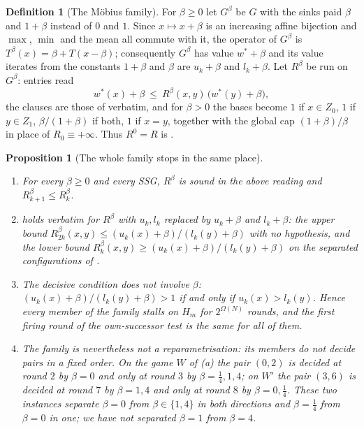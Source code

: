 \documentclass[11pt]{article}
\theoremstyle{plain}
\newtheorem{proposition}[theorem]{Proposition}
\theoremstyle{definition}
\newtheorem{definition}[theorem]{Definition}
\begin{document}
\begin{definition}[The M\"obius family]\label{def:mobius}
For $\beta\ge0$ let $G^{\beta}$ be $G$ with the sinks paid $\beta$ and
$1+\beta$ instead of $0$ and $1$. Since $x\mapsto x+\beta$ is an
increasing affine bijection and $\max$, $\min$ and the mean all commute
with it, the operator of $G^\beta$ is
$T^{\beta}(x)=\beta+T(x-\beta)$; consequently $G^\beta$ has value
$w^\ast+\beta$ and its value iterates from the constants $1+\beta$ and
$\beta$ are $u_k+\beta$ and $l_k+\beta$. Let $R^{\beta}$ be
 run on $G^{\beta}$: entries read
\[
  w^\ast(x)+\beta\ \le\ R^{\beta}(x,y)\,\bigl(w^\ast(y)+\beta\bigr),
\]
the clauses are those of  verbatim, and for $\beta>0$ the
bases become $1$ if $x\in Z_0$, $1$ if $y\in Z_1$, $\beta/(1+\beta)$ if
both, $1$ if $x=y$, together with the global cap $(1+\beta)/\beta$ in
place of $R_0\equiv+\infty$. Thus $R^{0}=R$ is .
\end{definition}

\begin{proposition}[The whole family stops in the same
place]\label{prop:mobius}
\begin{enumerate}[label=(\alph*),leftmargin=2.2em]
\item For every $\beta\ge0$ and every SSG, $R^{\beta}$ is sound in the
      above reading and $R^{\beta}_{k+1}\le R^{\beta}_k$.
\item {} holds verbatim for $R^{\beta}$ with
      $u_k,l_k$ replaced by $u_k+\beta$ and $l_k+\beta$: the upper bound
      $R^{\beta}_{2k}(x,y)\le(u_k(x)+\beta)/(l_k(y)+\beta)$ with no
      hypothesis, and the lower bound
      $R^{\beta}_{k}(x,y)\ge(u_k(x)+\beta)/(l_k(y)+\beta)$ on the
      separated configurations of .
\item The decisive condition does not involve $\beta$:
      $(u_k(x)+\beta)/(l_k(y)+\beta)>1$ if and only if $u_k(x)>l_k(y)$.
      Hence \emph{every} member of the family stalls on $H_m$ for
      $2^{\Omega(N)}$ rounds, and the first firing round of the
      own-successor test is the same for all of them.
\item The family is nevertheless not a reparametrisation: its members
      do not decide pairs in a fixed order. On the game $W$ of
      (a) the pair $(0,2)$ is decided at
      round $2$ by $\beta=0$ and only at round $3$ by
      $\beta=\tfrac14,1,4$; on $W'$ the pair $(3,6)$ is decided at round
      $7$ by $\beta=1,4$ and only at round $8$ by $\beta=0,\tfrac14$. These
      two instances separate $\beta=0$ from $\beta\in\{1,4\}$ in both
      directions and $\beta=\tfrac14$ from $\beta=0$ in one; we have not
      separated $\beta=1$ from $\beta=4$.
\end{enumerate}
\end{proposition}
\end{document}
